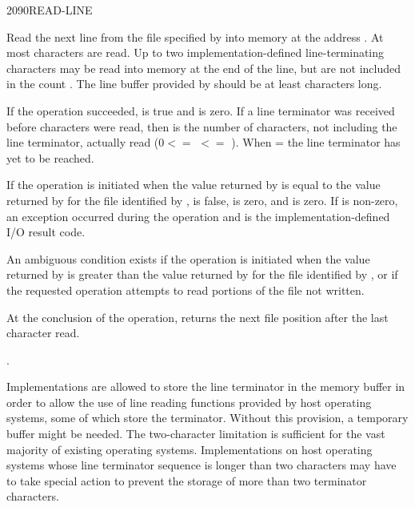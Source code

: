 \begin{worddef}{2090}{READ-LINE}
\item {}

	Read the next line from the file specified by  into
	memory at the address . At most  characters
	are read. Up to two implementation-defined line-terminating
	characters may be read into memory at the end of the line, but
	are not included in the count . The line buffer provided
	by  should be at least  characters long.

	If the operation succeeded,  is true and 
	is zero. If a line terminator was received before 
	characters were read, then  is the number of characters,
	not including the line terminator, actually read ($0 <=$ 
	$<=$ ). When  =  the line
	terminator has yet to be reached.

	If the operation is initiated when the value returned by
	 is equal to the value returned by
	 for the file identified by ,
	 is false,  is zero, and  is zero.
	If  is non-zero, an exception occurred during the
	operation and  is the implementation-defined I/O
	result code.

	An ambiguous condition exists if the operation is initiated when
	the value returned by  is greater than the
	value returned by  for the file identified by
	, or if the requested operation attempts to read
	portions of the file not written.

	At the conclusion of the operation,  returns
	the next file position after the last character read.

\see {}.

	\begin{rationale} %
		Implementations are allowed to store the line terminator in
		the memory buffer in order to allow the use of line reading
		functions provided by host operating systems, some of which
		store the terminator. Without this provision, a temporary
		buffer might be needed. The two-character limitation is
		sufficient for the vast majority of existing operating
		systems. Implementations on host operating systems whose line
		terminator sequence is longer than two characters may have to
		take special action to prevent the storage of more than two
		terminator characters.


\end{rationale}
\end{worddef}
